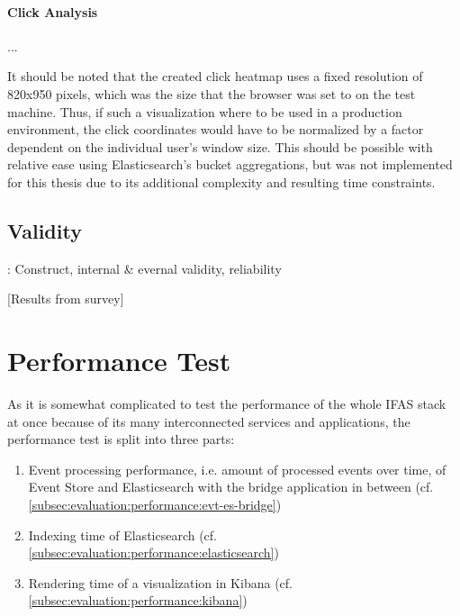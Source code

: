 \paragraph{Click Analysis}

...

It should be noted that the created click heatmap uses a fixed resolution of 820x950 pixels, which was the size that the browser was set to on the test machine.
Thus, if such a visualization where to be used in a production environment, the click coordinates would have to be normalized by a factor dependent on the individual user's window size.
This should be possible with relative ease using Elasticsearch's bucket aggregations, but was not implemented for this thesis due to its additional complexity and resulting time constraints.


\subsection{Validity}
\label{subec:evaluation:user:validity}

\cite{Easterbrook2008a}: Construct, internal \& evernal validity, reliability

[Results from survey]

\section{Performance Test}
\label{sec:evaluation:performance}

As it is somewhat complicated to test the performance of the whole \ac{IFAS} stack at once because of its many interconnected services and applications, the performance test is split into three parts:

\begin{enumerate}
\item Event processing performance, i.e. amount of processed events over time, of Event Store and Elasticsearch with the bridge application in between (cf. \cref{subsec:evaluation:performance:evt-es-bridge})
\item Indexing time of Elasticsearch (cf. \cref{subsec:evaluation:performance:elasticsearch})
\item Rendering time of a visualization in Kibana (cf. \cref{subsec:evaluation:performance:kibana})
\end{enumerate}

